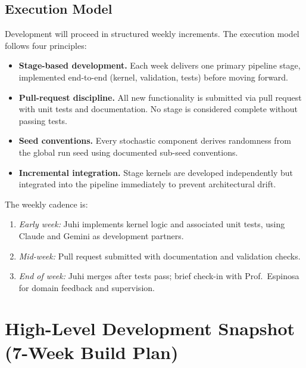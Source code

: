 \documentclass[11pt]{article}
\begin{document}
\subsection*{Execution Model}

Development will proceed in structured weekly increments. The execution model follows four
principles:

\begin{itemize}[leftmargin=1.6em, itemsep=2pt]
  \item \textbf{Stage-based development.} Each week delivers one primary pipeline stage,
        implemented end-to-end (kernel, validation, tests) before moving forward.
  \item \textbf{Pull-request discipline.} All new functionality is submitted via pull request
        with unit tests and documentation. No stage is considered complete without passing tests.
  \item \textbf{Seed conventions.} Every stochastic component derives randomness from the global
        run seed using documented sub-seed conventions.
  \item \textbf{Incremental integration.} Stage kernels are developed independently but
        integrated into the pipeline immediately to prevent architectural drift.
\end{itemize}

The weekly cadence is:
\begin{enumerate}[leftmargin=2em, itemsep=2pt]
  \item \textit{Early week:} Juhi implements kernel logic and associated unit tests,
        using Claude and Gemini as development partners.
  \item \textit{Mid-week:} Pull request submitted with documentation and validation checks.
  \item \textit{End of week:} Juhi merges after tests pass; brief check-in with
        Prof.\ Espinosa for domain feedback and supervision.
\end{enumerate}

\section{High-Level Development Snapshot (7-Week Build Plan)}
\end{document}
